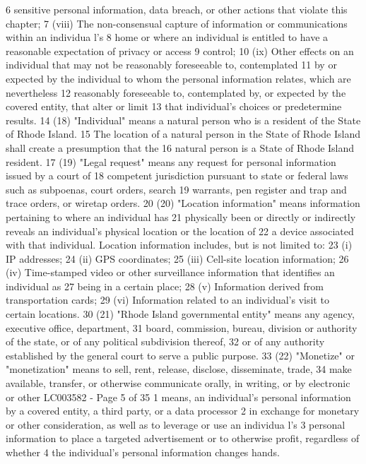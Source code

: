 6 sensitive personal information, data breach, or other actions that violate this chapter;
7 (viii) The non-consensual capture of information or communications within an individua l's
8 home or where an individual is entitled to have a reasonable expectation of privacy or access
9 control;
10 (ix) Other effects on an individual that may not be reasonably foreseeable to, contemplated
11 by or expected by the individual to whom the personal information relates, which are nevertheless
12 reasonably foreseeable to, contemplated by, or expected by the covered entity, that alter or limit
13 that individual's choices or predetermine results.
14 (18) "Individual" means a natural person who is a resident of the State of Rhode Island.
15 The location of a natural person in the State of Rhode Island shall create a presumption that the
16 natural person is a State of Rhode Island resident.
17 (19) "Legal request" means any request for personal information issued by a court of
18 competent jurisdiction pursuant to state or federal laws such as subpoenas, court orders, search
19 warrants, pen register and trap and trace orders, or wiretap orders.
20 (20) "Location information" means information pertaining to where an individual has
21 physically been or directly or indirectly reveals an individual's physical location or the location of
22 a device associated with that individual. Location information includes, but is not limited to:
23 (i) IP addresses;
24 (ii) GPS coordinates;
25 (iii) Cell-site location information;
26 (iv) Time-stamped video or other surveillance information that identifies an individual as
27 being in a certain place;
28 (v) Information derived from transportation cards;
29 (vi) Information related to an individual's visit to certain locations.
30 (21) "Rhode Island governmental entity" means any agency, executive office, department,
31 board, commission, bureau, division or authority of the state, or of any political subdivision thereof,
32 or of any authority established by the general court to serve a public purpose.
33 (22) "Monetize" or "monetization" means to sell, rent, release, disclose, disseminate, trade,
34 make available, transfer, or otherwise communicate orally, in writing, or by electronic or other 
LC003582 - Page 5 of 35
1 means, an individual's personal information by a covered entity, a third party, or a data processor
2 in exchange for monetary or other consideration, as well as to leverage or use an individua l's
3 personal information to place a targeted advertisement or to otherwise profit, regardless of whether
4 the individual's personal information changes hands.
